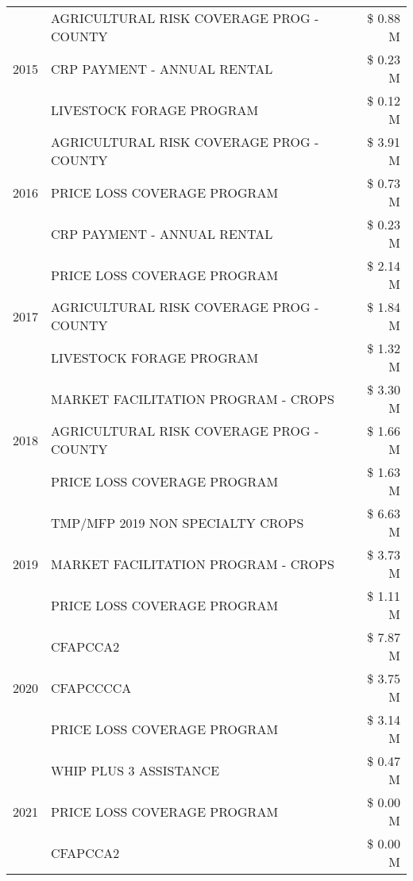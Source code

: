 \begin{tabular}{llr}
\multirow[t]{3}{*}{2015} & AGRICULTURAL RISK COVERAGE PROG - COUNTY & \$ 0.88 M \\
 & CRP PAYMENT - ANNUAL RENTAL & \$ 0.23 M \\
 & LIVESTOCK FORAGE PROGRAM & \$ 0.12 M \\
\cline{1-3}
\multirow[t]{3}{*}{2016} & AGRICULTURAL RISK COVERAGE PROG - COUNTY & \$ 3.91 M \\
 & PRICE LOSS COVERAGE PROGRAM & \$ 0.73 M \\
 & CRP PAYMENT - ANNUAL RENTAL & \$ 0.23 M \\
\cline{1-3}
\multirow[t]{3}{*}{2017} & PRICE LOSS COVERAGE PROGRAM & \$ 2.14 M \\
 & AGRICULTURAL RISK COVERAGE PROG - COUNTY & \$ 1.84 M \\
 & LIVESTOCK FORAGE PROGRAM & \$ 1.32 M \\
\cline{1-3}
\multirow[t]{3}{*}{2018} & MARKET FACILITATION PROGRAM - CROPS & \$ 3.30 M \\
 & AGRICULTURAL RISK COVERAGE PROG - COUNTY & \$ 1.66 M \\
 & PRICE LOSS COVERAGE PROGRAM & \$ 1.63 M \\
\cline{1-3}
\multirow[t]{3}{*}{2019} & TMP/MFP 2019 NON SPECIALTY CROPS & \$ 6.63 M \\
 & MARKET FACILITATION PROGRAM - CROPS & \$ 3.73 M \\
 & PRICE LOSS COVERAGE PROGRAM & \$ 1.11 M \\
\cline{1-3}
\multirow[t]{3}{*}{2020} & CFAPCCA2 & \$ 7.87 M \\
 & CFAPCCCCA & \$ 3.75 M \\
 & PRICE LOSS COVERAGE PROGRAM & \$ 3.14 M \\
\cline{1-3}
\multirow[t]{3}{*}{2021} & WHIP PLUS 3 ASSISTANCE & \$ 0.47 M \\
 & PRICE LOSS COVERAGE PROGRAM & \$ 0.00 M \\
 & CFAPCCA2 & \$ 0.00 M \\
\cline{1-3}
\bottomrule
\end{tabular}
